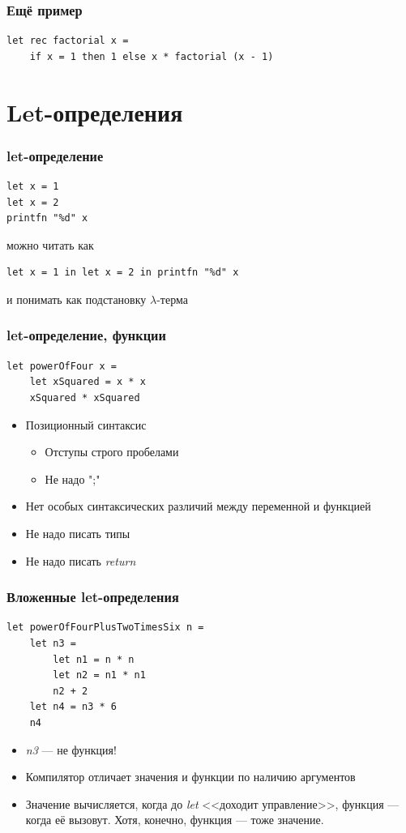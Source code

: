 \documentclass[xetex,mathserif,serif]{beamer}
\begin{document}
	\begin{frame}[fragile]
		\frametitle{Ещё пример}
		\begin{verbatim}
let rec factorial x =
    if x = 1 then 1 else x * factorial (x - 1)
		\end{verbatim}
	\end{frame}
	
	\section{Let-определения}

	\begin{frame}[fragile]
		\frametitle{let-определение}
		\begin{verbatim}
let x = 1
let x = 2
printfn "%d" x
		\end{verbatim}
		можно читать как
		\begin{verbatim}
let x = 1 in let x = 2 in printfn "%d" x
		\end{verbatim}
		и понимать как подстановку $\lambda$-терма
	\end{frame}
		
	\begin{frame}[fragile]
		\frametitle{let-определение, функции}
		\begin{verbatim}
let powerOfFour x = 
    let xSquared = x * x
    xSquared * xSquared
		\end{verbatim}
		\begin{itemize}
			\item Позиционный синтаксис
			\begin{itemize}
				\item Отступы строго пробелами
				\item Не надо ";"
			\end{itemize}
			\item Нет особых синтаксических различий между переменной и функцией
			\item Не надо писать типы
			\item Не надо писать \textit{return}
		\end{itemize}
	\end{frame}

	\begin{frame}[fragile]
		\frametitle{Вложенные let-определения}
		\begin{verbatim}
let powerOfFourPlusTwoTimesSix n =
    let n3 =
        let n1 = n * n
        let n2 = n1 * n1
        n2 + 2
    let n4 = n3 * 6
    n4
		\end{verbatim}
		\begin{itemize}
			\item \textit{n3} --- не функция!
			\item Компилятор отличает значения и функции по наличию аргументов
			\item Значение вычисляется, когда до \textit{let} <<доходит управление>>, 
					функция --- когда её вызовут. Хотя, конечно, функция --- тоже значение.
		\end{itemize}
	\end{frame}
			
\end{document}
